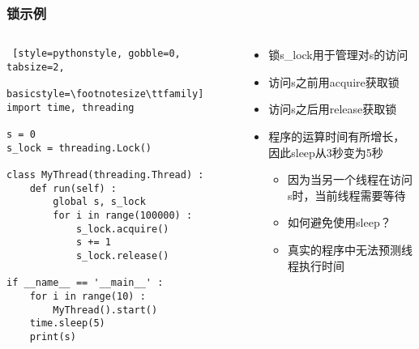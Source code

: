 \begin{frame}[fragile]
	\frametitle{锁示例}
	\begin{columns}[T]
		\begin{column}[T]{.5\textwidth}
			\begin{lstlisting} [style=pythonstyle, gobble=0, tabsize=2,
								basicstyle=\footnotesize\ttfamily]
import time, threading

s = 0
s_lock = threading.Lock()

class MyThread(threading.Thread) :
	def run(self) :
		global s, s_lock
		for i in range(100000) :
			s_lock.acquire()
			s += 1
			s_lock.release()

if __name__ == '__main__' :
	for i in range(10) :
		MyThread().start()
	time.sleep(5)
	print(s)
			\end{lstlisting}
		\end{column}
		\begin{column}[T]{.5\textwidth}
			\begin{itemize}
			\item 锁s\_lock用于管理对s的访问
			\item 访问s之前用acquire获取锁
			\item 访问s之后用release获取锁
			\item 程序的运算时间有所增长，因此sleep从3秒变为5秒
				\begin{itemize}
				\item 因为当另一个线程在访问s时，当前线程需要等待
				\item 如何避免使用sleep？
				\item 真实的程序中无法预测线程执行时间
				\end{itemize}
			\end{itemize}
		\end{column}
	\end{columns}
\end{frame}

